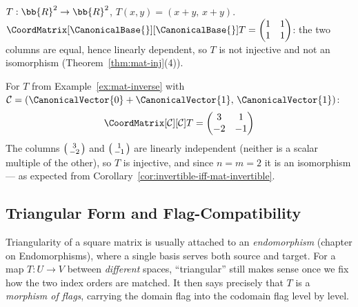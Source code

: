\begin{example}
    $T: \bb{R}^2 \to \bb{R}^2$, $T(x,y) = (x+y,\, x+y)$.
    $\CoordMatrix[\CanonicalBase{}][\CanonicalBase{}]{T}
    = \begin{pmatrix}1&1\\1&1\end{pmatrix}$: the two columns are equal, hence linearly
    dependent, so $T$ is not injective and not an isomorphism
    (Theorem~\ref{thm:mat-inj}(4)).
\end{example}

\begin{example}
    For $T$ from Example~\ref{ex:mat-inverse} with $\mathcal{C} = (\CanonicalVector{0}+\CanonicalVector{1},\, \CanonicalVector{1})$:
    \[
        \CoordMatrix[\mathcal{C}][\mathcal{C}]{T}
        = \begin{pmatrix}3&1\\-2&-1\end{pmatrix}
    \]
    The columns $\begin{psmallmatrix}3\\-2\end{psmallmatrix}$ and
    $\begin{psmallmatrix}1\\-1\end{psmallmatrix}$ are linearly independent (neither is a
    scalar multiple of the other), so $T$ is injective, and since $n = m = 2$ it is an
    isomorphism --- as expected from Corollary~\ref{cor:invertible-iff-mat-invertible}.
\end{example}

\subsection{Triangular Form and Flag-Compatibility}
\label{sec:triangular-two-bases}

\begin{remark}[Motivation]
    Triangularity of a square matrix is usually attached to an \emph{endomorphism} (chapter on
    Endomorphisms), where a single basis serves both source and target. For a map $T: U \to V$
    between \emph{different} spaces, ``triangular'' still makes sense once we fix how the two
    index orders are matched. It then says precisely that $T$ is a \emph{morphism of flags},
    carrying the domain flag into the codomain flag level by level.
\end{remark}

